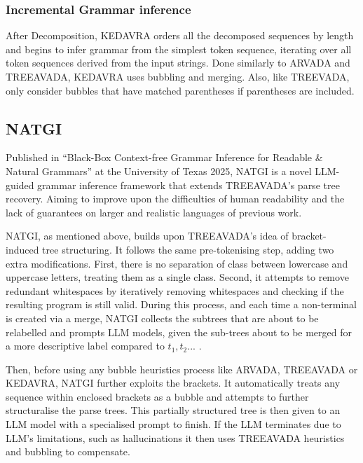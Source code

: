 \subsubsection{Incremental Grammar inference}

After Decomposition, KEDAVRA orders all the decomposed sequences by length and begins to infer grammar from the simplest token sequence, iterating over all token sequences derived from the input strings. Done similarly to ARVADA and TREEAVADA, KEDAVRA uses bubbling and merging. Also, like TREEVADA, only consider bubbles that have matched parentheses if parentheses are included. 

\subsection{NATGI}

Published in \enquote{Black-Box Context-free Grammar Inference for Readable \& Natural Grammars} at the University of Texas 2025\cite{arefinBlackboxContextfreeGrammar2025}, NATGI is a novel LLM-guided grammar inference framework that extends TREEAVADA's parse tree recovery. Aiming to improve upon the difficulties of human readability and the lack of guarantees on larger and realistic languages of previous work.

\vspace{\baselineskip}

NATGI, as mentioned above, builds upon TREEAVADA's idea of bracket-induced tree structuring. It follows the same pre-tokenising step, adding two extra modifications. First, there is no separation of class between lowercase and uppercase letters, treating them as a single class. Second, it attempts to remove redundant whitespaces by iteratively removing whitespaces and checking if the resulting program is still valid. During this process, and each time a non-terminal is created via a merge, NATGI collects the subtrees that are about to be relabelled and prompts LLM models, given the sub-trees about to be merged for a more descriptive label compared to $t_1, t_2 ...$ .

\vspace{\baselineskip}
Then, before using any bubble heuristics process like ARVADA, TREEAVADA or KEDAVRA, NATGI further exploits the brackets. It automatically treats any sequence within enclosed brackets as a bubble and attempts to further structuralise the parse trees. This partially structured tree is then given to an LLM model with a specialised prompt to finish. If the LLM terminates due to LLM's limitations, such as hallucinations \cite{orvalhoAreLargeLanguage2025a,arefinBlackboxContextfreeGrammar2025,} it then uses TREEAVADA heuristics and bubbling to compensate.

